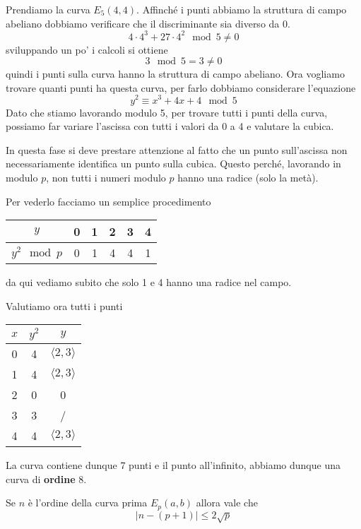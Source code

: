 \begin{example}
	Prendiamo la curva $E_5(4, 4)$. Affinch\'e i punti abbiamo la struttura di campo abeliano dobbiamo verificare
	che il discriminante sia diverso da 0.
	\[ 4 \cdot 4^3 + 27 \cdot 4^2 \mod{5} \neq 0 \]
	sviluppando un po' i calcoli si ottiene
	\[ 3 \mod{5} = 3 \neq 0 \]
	quindi i punti sulla curva hanno la struttura di campo abeliano. Ora vogliamo trovare quanti punti ha questa
	curva, per farlo dobbiamo considerare l'equazione
	\[ y^2 \equiv x^3 + 4x + 4 \mod{5} \]
	Dato che stiamo lavorando modulo 5, per trovare tutti i punti della curva, possiamo far variare l'ascissa con
	tutti i valori da 0 a 4 e valutare la cubica.

	In questa fase si deve prestare attenzione al fatto che un punto sull'ascissa non necessariamente identifica
	un punto sulla cubica. Questo perch\'e, lavorando in modulo $p$, non tutti i numeri modulo $p$ hanno una radice
	(solo la met\`a).

	Per vederlo facciamo un semplice procedimento
	\begin{center}
		\begin{tabular}{ c | c c c c c }
			$y$           & 0 & 1 & 2 & 3 & 4 \\
			\hline
			$y^2 \mod{p}$ & 0 & 1 & 4 & 4 & 1
		\end{tabular}
	\end{center}
	da qui vediamo subito che solo 1 e 4 hanno una radice nel campo.

	Valutiamo ora tutti i punti
	\begin{center}
		\begin{tabular}{ c | c | c }
			$x$ & $y^2$ & $y$                    \\
			\hline
			0   & 4     & $\langle 2, 3 \rangle$ \\
			1   & 4     & $\langle 2, 3 \rangle$ \\
			2   & 0     & 0                      \\
			3   & 3     & /                      \\
			4   & 4     & $\langle 2, 3 \rangle$
		\end{tabular}
	\end{center}
	La curva contiene dunque 7 punti e il punto all'infinito, abbiamo dunque una curva di \textbf{ordine} 8.
\end{example}

\begin{theorem}
	Se $n$ \`e l'ordine della curva prima $E_p(a, b)$ allora vale che
	\[ |n - (p + 1)| \leq 2 \sqrt{p} \]
\end{theorem}

